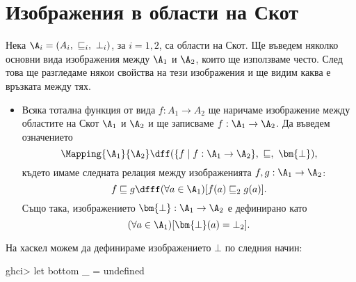 \section{Изображения в области на Скот}

Нека $\A_i = (A_i,\ \sqsubseteq_i,\ \bot_i)$, за $i = 1,2$, са области на Скот.
Ще въведем няколко основни вида изображения между $\A_1$ и $\A_2$, 
които ще използваме често. След това ще разгледаме някои свойства на тези изображения
и ще видим каква е връзката между тях.
\begin{itemize}
\item
  Всяка тотална функция от вида $f:A_1 \to A_2$ ще наричаме изображение между областите на Скот $\A_1$ и $\A_2$
  и ще записваме $f:\A_1 \to \A_2$.
  Да въведем означението 
  \[\Mapping{\A_1}{\A_2} \dff (\{f \mid f:\A_1 \to \A_2\},\ \sqsubseteq,\ \bm{\bot}),\]
  където имаме следната релация между изображенията $f,g:\A_1 \to \A_2$:
  \[f \sqsubseteq g \dfff (\forall a \in \A_1)[f(a) \sqsubseteq_2 g(a)].\]
  Също така, изображението $\bm{\bot}:\A_1 \to \A_2$ е дефинирано като
  \[(\forall a \in \A_1)[\bm{\bot}(a) = \bot_2].\]
\end{itemize}
На хаскел можем да дефинираме изображението $\bm{\bot}$ по следния начин:
\begin{haskellcode}
ghci> let bottom _ = undefined
\end{haskellcode}

